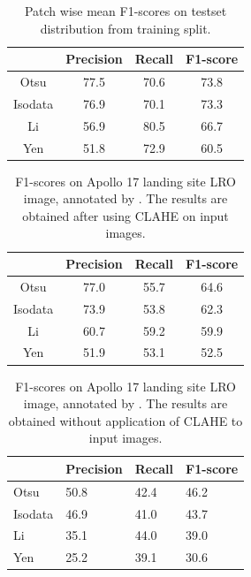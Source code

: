\documentclass[11pt]{article}
\begin{document}
\begin{table}[H]
	\centering
	\caption{Patch wise mean F1-scores on testset distribution from training split.}
	\begin{tabular}{c|c|c|c|}
		\cline{2-4}
		\multicolumn{1}{l|}{}         & Precision & Recall & F1-score \\ \hline
		\multicolumn{1}{|c|}{Otsu}    & 77.5      & 70.6   & 73.8     \\ \hline
		\multicolumn{1}{|c|}{Isodata} & 76.9      & 70.1   & 73.3     \\ \hline
		\multicolumn{1}{|c|}{Li}      & 56.9      & 80.5   & 66.7     \\ \hline
		\multicolumn{1}{|c|}{Yen}     & 51.8      & 72.9   & 60.5     \\ \hline
	\end{tabular}
	\label{mine}
\end{table}

\begin{table}[H]
	\centering
	\caption{F1-scores on Apollo 17 landing site LRO image, annotated by \cite{dino2020}. The results are obtained after using CLAHE on input images.}
	\begin{tabular}{c|c|c|c|}
		\cline{2-4}
		\multicolumn{1}{l|}{}         & Precision & Recall & F1-score \\ \hline
		\multicolumn{1}{|c|}{Otsu}    & 77.0      & 55.7   & 64.6     \\ \hline
		\multicolumn{1}{|c|}{Isodata} & 73.9      & 53.8   & 62.3     \\ \hline
		\multicolumn{1}{|c|}{Li}      & 60.7      & 59.2   & 59.9     \\ \hline
		\multicolumn{1}{|c|}{Yen}     & 51.9      & 53.1   & 52.5     \\ \hline
	\end{tabular}
	\label{dino}
\end{table}

\begin{table}[H]
	\centering
	\caption{F1-scores on Apollo 17 landing site LRO image, annotated by \cite{dino2020}. The results are obtained without application of CLAHE to input images.}
	\begin{tabular}{l|l|l|l|}
		\cline{2-4}
		\multicolumn{1}{c|}{}         & Precision & Recall & F1-score \\ \hline
		\multicolumn{1}{|l|}{Otsu}    & 50.8      & 42.4   & 46.2     \\ \hline
		\multicolumn{1}{|l|}{Isodata} & 46.9      & 41.0   & 43.7     \\ \hline
		\multicolumn{1}{|l|}{Li}      & 35.1      & 44.0   & 39.0     \\ \hline
		\multicolumn{1}{|l|}{Yen}     & 25.2      & 39.1   & 30.6     \\ \hline
	\end{tabular}
	\label{without_clahe}
\end{table}
\end{document}
